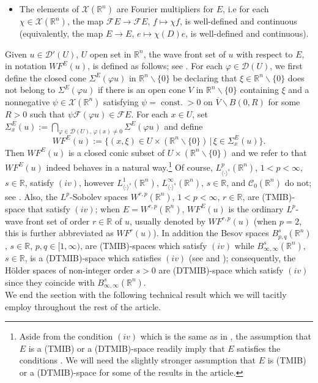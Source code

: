 \documentclass[12pt,reqno]{amsart}
\newcommand{\RR}{\mathbb R}
\newcommand{\DD}{\mathcal D}
\newcommand{\XX}{\mathcal X}
\theoremstyle{plain}
\theoremstyle{remark}
\theoremstyle{definition}
\numberwithin{equation}{section}
\begin{document}
\begin{itemize}
\item[$(iv)$] The elements of $\XX(\RR^n)$ are Fourier multipliers for $E$, i.e for each $\chi\in\XX(\RR^n)$, the map $\mathcal{F}E\rightarrow \mathcal{F}E$, $f\mapsto \chi f$, is well-defined and continuous (equivalently, the map $E\rightarrow E$, $e\mapsto \chi(D) e$, is well-defined and continuous).
\end{itemize}
Given $u\in\DD'(U)$, $U$ open set in $\RR^n$, the wave front set of $u$ with respect to $E$, in notation $WF^E(u)$, is defined as follows; see \cite[Section 3]{DPP}. For each $\varphi\in\DD(U)$, we first define the closed cone $\Sigma^E(\varphi u)$ in $\RR^n\backslash\{0\}$ be declaring that $\xi\in\RR^n\backslash\{0\}$ does not belong to $\Sigma^E(\varphi u)$ if there is an open cone $V$ in $\RR^n\backslash\{0\}$ containing $\xi$ and a nonnegative $\psi\in\XX(\RR^n)$ satisfying $\psi=\operatorname{const.}>0$ on $\overline{V}\backslash B(0,R)$ for some $R>0$ such that $\psi\mathcal{F}(\varphi u)\in\mathcal{F}E$. For each $x\in U$, set $\Sigma^E_x(u):=\bigcap_{\varphi\in\DD(U),\, \varphi(x)\neq0}\Sigma^E(\varphi u)$ and define
\begin{equation*}
WF^E(u):=\{(x,\xi)\in U\times(\RR^n\backslash\{0\})\,|\, \xi\in \Sigma^E_x(u)\}.
\end{equation*}
Then $WF^E(u)$ is a closed conic subset of $U\times(\RR^n\backslash\{0\})$ and we refer to \cite[Section 3]{DPP} that $WF^E(u)$ indeed behaves in a natural way.\footnote{Aside from the condition $(iv)$ which is the same as in \cite[Section 3]{DPP}, the assumption that $E$ is a (TMIB) or a (DTMIB)-space readily imply that $E$ satisfies the conditions \cite[$(i)$-$(iii)$ in Section 3]{DPP}. We will need the slightly stronger assumption that $E$ is (TMIB) or a (DTMIB)-space for some of the results in the article.} Of course, $L^p_{\langle\cdot\rangle^s}(\RR^n)$, $1<p<\infty$, $s\in\RR$, satisfy $(iv)$, however $L^1_{\langle\cdot\rangle^s}(\RR^n)$, $L^{\infty}_{\langle\cdot\rangle^s}(\RR^n)$, $s\in\RR$, and $\mathcal{C}_0(\RR^n)$ do not; see \cite[Theorem 2.10]{DPP}. Also, the $L^p$-Sobolev spaces $W^{r,p}(\RR^n)$, $1<p<\infty$, $r\in\RR$, are (TMIB)-space that satisfy $(iv)$; when $E=W^{r,p}(\RR^n)$, $WF^E(u)$ is the ordinary $L^p$-wave front set of order $r\in\RR$ of $u$, usually denoted by $WF^{r,p}(u)$ (when $p=2$, this is further abbreviated as $WF^r(u)$). In addition the Besov spaces $B^s_{p,q}(\RR^n)$, $s\in\RR$, $p,q\in[1,\infty)$, are (TMIB)-spaces which satisfy $(iv)$ while $B^s_{\infty,\infty}(\RR^n)$, $s\in\RR$, is a (DTMIB)-space which satisfies $(iv)$ (see \cite[Theorem 2.17, p. 257, and Corollary 5.2, p. 608]{sawano} and \cite[Theorem, p. 140]{triebel}); consequently, the H\"older spaces of non-integer order $s>0$ are (DTMIB)-space which satisfy $(iv)$ since they coincide with $B^s_{\infty,\infty}(\RR^n)$.\\
\indent We end the section with the following technical result which we will tacitly employ throughout the rest of the article.
\end{document}
